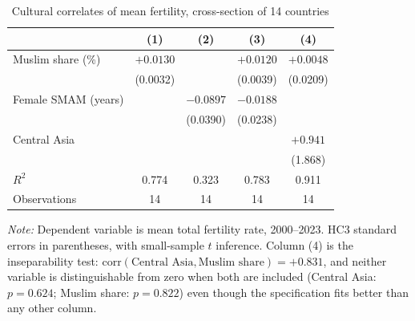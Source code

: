 \begin{table}[htbp]
\centering
\caption{Cultural correlates of mean fertility, cross-section of 14 countries}
\label{tab:crosssection}
\small
\begin{tabular}{lcccc}
\toprule
 & (1) & (2) & (3) & (4) \\
\midrule
Muslim share (\%)      & $+0.0130$ &          & $+0.0120$ & $+0.0048$ \\
                       & (0.0032)  &          & (0.0039)  & (0.0209) \\
Female SMAM (years)    &           & $-0.0897$ & $-0.0188$ &          \\
                       &           & (0.0390)  & (0.0238)  &          \\
Central Asia           &           &           &           & $+0.941$ \\
                       &           &           &           & (1.868) \\
\midrule
$R^2$                  & 0.774 & 0.323 & 0.783 & 0.911 \\
Observations           & 14 & 14 & 14 & 14 \\
\bottomrule
\end{tabular}

\begin{minipage}{\textwidth}\footnotesize
\vspace{4pt}
\emph{Note:} Dependent variable is mean total fertility rate, 2000--2023. HC3 standard
errors in parentheses, with small-sample $t$ inference. Column (4) is the inseparability
test: $\mathrm{corr}(\text{Central Asia}, \text{Muslim share}) = +0.831$, and neither
variable is distinguishable from zero when both are included
(Central Asia: $p = 0.624$; Muslim share: $p = 0.822$) even though the specification fits
better than any other column.
\end{minipage}
\end{table}
